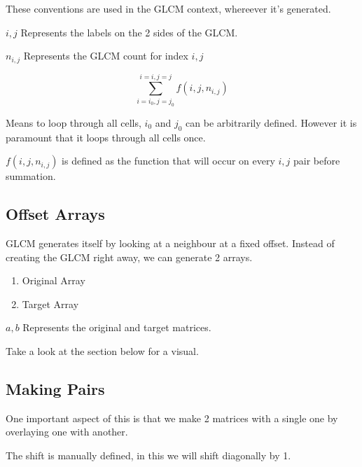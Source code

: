 \documentclass[article,oneside]{memoir}
\begin{document}
These conventions are used in the GLCM context, whereever it's generated.

$i, j$ Represents the labels on the 2 sides of the GLCM.

$n_{i, j}$ Represents the GLCM count for index $i, j$

$$\sum_{i=i_0,j=j_0}^{i=i,j=j}f(i, j, n_{i,j})$$

Means to loop through all cells, $i_0$ and $j_0$ can be arbitrarily defined. However it is paramount that it loops through all cells once.

$f(i, j, n_{i,j})$ is defined as the function that will occur on every $i, j$ pair before summation.

\subsection{Offset Arrays}

GLCM generates itself by looking at a neighbour at a fixed offset. Instead of creating the GLCM right away, we can generate 2 arrays.

\begin{enumerate}
\item{Original Array}
\item{Target Array}
\end{enumerate}

$a, b$ Represents the original and target matrices.

Take a look at the section below for a visual.

\subsection{Making Pairs}

One important aspect of this is that we make 2 matrices with a single one by overlaying one with another.

The shift is manually defined, in this we will shift diagonally by 1.
\end{document}
